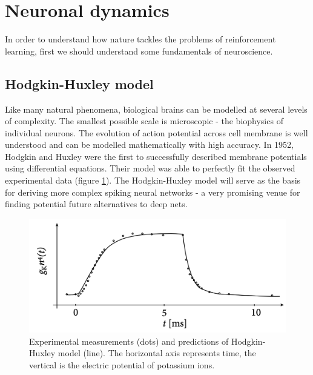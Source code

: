 \documentclass[oneside,english,logo]{amuthesis}
\begin{document}
\section{Neuronal dynamics}

In order to understand how nature tackles the problems of reinforcement learning, first we should understand some fundamentals of neuroscience. 

\subsection{Hodgkin-Huxley model}

Like many natural phenomena, biological brains can be modelled at several levels of complexity. The smallest possible scale is microscopic - the biophysics of individual neurons. The evolution of action potential across cell membrane is well understood and can be modelled mathematically with high accuracy. In 1952, Hodgkin and Huxley \cite{hodgkin} were the first to successfully described membrane potentials using differential equations. Their model was able to perfectly fit the observed experimental data (figure \ref{fig:hodgkin_huxley_experiments}). The Hodgkin-Huxley model will serve as the basis for deriving more complex spiking neural networks - a very promising venue for finding potential future alternatives to deep nets.
\begin{figure}[!htbp]
	\centering
	\includegraphics[width=13cm]{hodgkin_huxley_experiments}
	\caption{Experimental measurements (dots) and predictions of Hodgkin-Huxley model  (line). The horizontal axis represents time, the vertical is the electric potential of potassium ions.}
	\label{fig:hodgkin_huxley_experiments}
\end{figure} 
\end{document}
